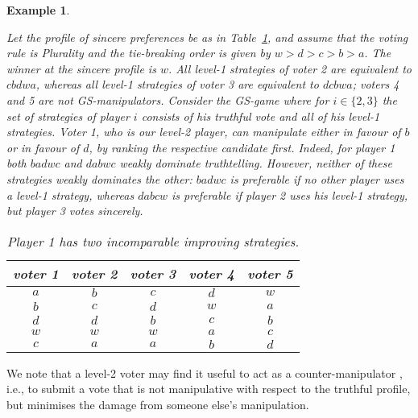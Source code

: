 \documentclass[11pt]{article}
\newtheorem{example}{Example}
\begin{document}
\begin{example}\label{ex:lowerranked}
{\em
Let the profile of sincere preferences be as in Table~\ref{table:example}, and assume that 
the voting rule is Plurality and the tie-breaking order is given by $w>d>c>b>a$. 
The winner at the sincere profile is $w$. All level-1 strategies of voter 2 are equivalent to
$cbdwa$, whereas all level-1 strategies of voter 3 are equivalent to
$dcbwa$; voters 4 and 5 are not GS-manipulators.
Consider the GS-game where for $i\in\{2, 3\}$
the set of strategies of player $i$ consists of his truthful vote and all of his level-1 strategies.
Voter 1, who is our level-2 player, 
can manipulate either in favour of $b$ or in favour of $d$, by ranking the respective candidate first. 
Indeed, for player 1 both $badwc$ and $dabwc$ weakly dominate truthtelling.
However, neither of these strategies weakly dominates the other:
$badwc$ is preferable if no other player uses a level-1 strategy, whereas $dabcw$
is preferable if player 2 uses his level-1 strategy, but player 3 votes sincerely.

\begin{table}[h]
\begin{center}
\begin{tabular}{c|c|c|c|c}
voter 1&voter 2&voter 3&voter 4&voter 5\\
\midrule
$a$&$b$&$c$&$d$&$w$\\
$b$&$c$&$d$&$w$&$a$\\
$d$&$d$&$b$&$c$&$b$\\
$w$&$w$&$w$&$a$&$c$\\
$c$&$a$&$a$&$b$&$d$\\
\end{tabular}
\caption{Player 1 has two incomparable improving strategies.
}\label{table:example}
\end{center}
\end{table}
}
\end{example}

We note that a level-2 voter may find it useful to act as a counter-manipulator
\citep{pattanaik1976threats,EGHRS}, i.e., 
to submit a vote that is not manipulative with respect to the truthful
profile, but minimises the damage from someone else's manipulation.
\end{document}
